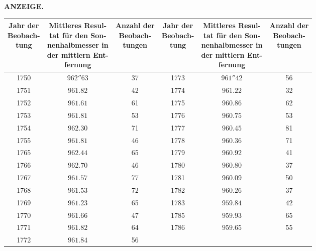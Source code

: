 \clearpage
\noindent{}%
%
\parbox[t]{\dimexpr\linewidth-24mm\relax}{\centering\footnotesize\bfseries ANZEIGE.\par}%
\makebox[12mm][r]{}\par\nobreak\medskip
\begin{center}\small
\setlength{\tabcolsep}{3pt}
\begin{tabular}{c|c|c||c|c|c}
\shortstack{Jahr der\\Beobach-\\tung}&\shortstack{Mittleres Resul-\\tat für den Son-\\nenhalbmesser in\\der mittlern Ent-\\fernung}&\shortstack{Anzahl der\\Beobach-\\tungen}&\shortstack{Jahr der\\Beobach-\\tung}&\shortstack{Mittleres Resul-\\tat für den Son-\\nenhalbmesser in\\der mittlern Ent-\\fernung}&\shortstack{Anzahl der\\Beobach-\\tungen}\\ \hline
1750 & $962''63$ & 37 & 1773 & $961''42$ & 56 \\
1751 & $961.82$ & 42 & 1774 & $961.22$ & 32 \\
1752 & $961.61$ & 61 & 1775 & $960.86$ & 62 \\
1753 & $961.81$ & 53 & 1776 & $960.75$ & 53 \\
1754 & $962.30$ & 71 & 1777 & $960.45$ & 81 \\
1755 & $961.81$ & 46 & 1778 & $960.36$ & 71 \\
1765 & $962.44$ & 65 & 1779 & $960.92$ & 41 \\
1766 & $962.70$ & 46 & 1780 & $960.80$ & 37 \\
1767 & $961.57$ & 77 & 1781 & $960.09$ & 50 \\
1768 & $961.53$ & 72 & 1782 & $960.26$ & 37 \\
1769 & $961.23$ & 65 & 1783 & $959.84$ & 42 \\
1770 & $961.66$ & 47 & 1785 & $959.93$ & 65 \\
1771 & $961.82$ & 64 & 1786 & $959.65$ & 55 \\
1772 & $961.84$ & 56 & & & \\
\end{tabular}\end{center}

